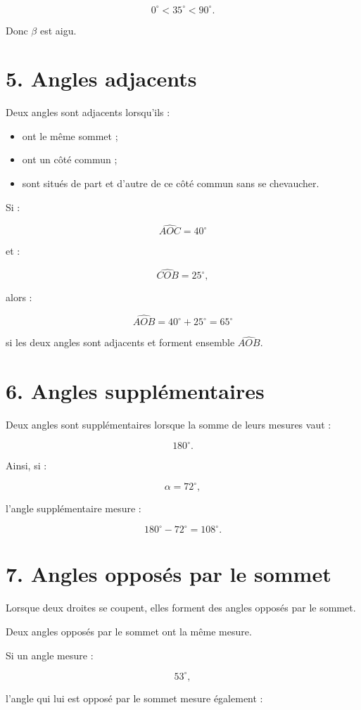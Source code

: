 \[
0^\circ<35^\circ<90^\circ.
\]

Donc $\beta$ est aigu.

\section{5. Angles adjacents}

Deux angles sont adjacents lorsqu’ils :

\begin{itemize}
\item ont le même sommet ;
\item ont un côté commun ;
\item sont situés de part et d’autre de ce côté commun sans se chevaucher.
\end{itemize}

Si :

\[
\widehat{AOC}=40^\circ
\]

et :

\[
\widehat{COB}=25^\circ,
\]

alors :

\[
\widehat{AOB}=40^\circ+25^\circ=65^\circ
\]

si les deux angles sont adjacents et forment ensemble $\widehat{AOB}$.

\section{6. Angles supplémentaires}

Deux angles sont supplémentaires lorsque la somme de leurs mesures vaut :

\[
180^\circ.
\]

Ainsi, si :

\[
\alpha=72^\circ,
\]

l’angle supplémentaire mesure :

\[
180^\circ-72^\circ=108^\circ.
\]

\section{7. Angles opposés par le sommet}

Lorsque deux droites se coupent, elles forment des angles opposés par le sommet.

Deux angles opposés par le sommet ont la même mesure.

Si un angle mesure :

\[
53^\circ,
\]

l’angle qui lui est opposé par le sommet mesure également :

